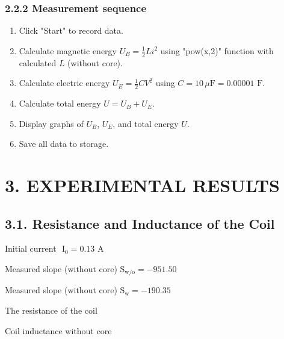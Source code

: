 \documentclass[12pt,oneside,a4paper]{article}
\theoremstyle{definition}
\begin{document}
	\subsubsection*{2.2.2 Measurement sequence}
	\begin{enumerate}[leftmargin=1.5em]
		\item Click "Start" to record data.
		\item Calculate magnetic energy $U_B = \frac{1}{2} L i^2$ using "pow(x,2)" function with calculated $L$ (without core).
		\item Calculate electric energy $U_E = \frac{1}{2} C V^2$ using $C = 10\,\mu\text{F} = 0.00001\text{ F}$.
		\item Calculate total energy $U = U_B + U_E$.
		\item Display graphs of $U_B$, $U_E$, and total energy $U$.
		\item Save all data to storage.
	\end{enumerate}
	
	\section*{3. EXPERIMENTAL RESULTS}
	\subsection*{3.1. Resistance and Inductance of the Coil}
	\hspace{1.23em}
	Initial current $\text{ I}_0 = 0.13 \text{ A}$
	
	\vspace{0.2cm}
	Measured slope (without core) $\text{S}_{\text{w/o}} = -951.50$
	
	\vspace{0.2cm}
	Measured slope (without core) $\text{S}_{\text{w}} = -190.35$
	
	\vspace{0.2cm}
	The resistance of the coil
	\begin{center}
	\end{center}
	
	Coil inductance without core
	\begin{center}
	\end{center}
		
\end{document}

